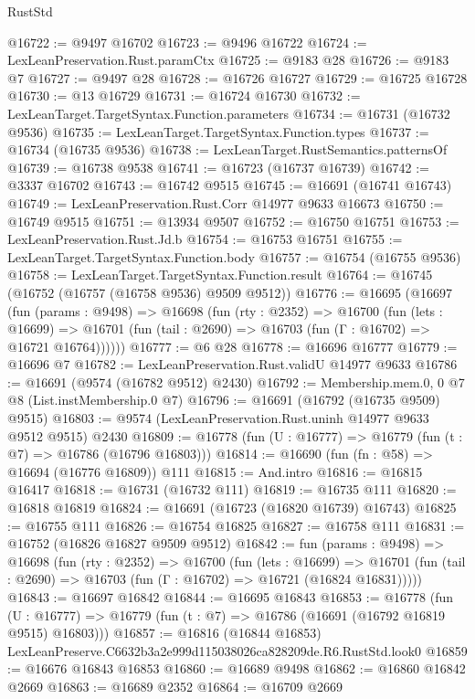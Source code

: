 \begin{lexlean}{RustStd}
\begin{coremodule}
@16722 := @9497 @16702
@16723 := @9496 @16722
@16724 := LexLeanPreservation.Rust.paramCtx
@16725 := @9183 @28
@16726 := @9183 @7
@16727 := @9497 @28
@16728 := @16726 @16727
@16729 := @16725 @16728
@16730 := @13 @16729
@16731 := @16724 @16730
@16732 := LexLeanTarget.TargetSyntax.Function.parameters
@16734 := @16731 (@16732 @9536)
@16735 := LexLeanTarget.TargetSyntax.Function.types
@16737 := @16734 (@16735 @9536)
@16738 := LexLeanTarget.RustSemantics.patternsOf
@16739 := @16738 @9538
@16741 := @16723 (@16737 @16739)
@16742 := @3337 @16702
@16743 := @16742 @9515
@16745 := @16691 (@16741 @16743)
@16749 := LexLeanPreservation.Rust.Corr @14977 @9633 @16673
@16750 := @16749 @9515
@16751 := @13934 @9507
@16752 := @16750 @16751
@16753 := LexLeanPreservation.Rust.Jd.b
@16754 := @16753 @16751
@16755 := LexLeanTarget.TargetSyntax.Function.body
@16757 := @16754 (@16755 @9536)
@16758 := LexLeanTarget.TargetSyntax.Function.result
@16764 := @16745 (@16752 (@16757 (@16758 @9536) @9509 @9512))
@16776 := @16695
    (@16697
      (fun (params : @9498) =>
      @16698
        (fun (rty : @2352) =>
        @16700
          (fun (lets : @16699) =>
          @16701 (fun (tail : @2690) => @16703 (fun (Γ : @16702) => @16721 @16764))))))
@16777 := @6 @28
@16778 := @16696 @16777
@16779 := @16696 @7
@16782 := LexLeanPreservation.Rust.validU @14977 @9633
@16786 := @16691 (@9574 (@16782 @9512) @2430)
@16792 := Membership.mem.{0, 0} @7 @8 (List.instMembership.{0} @7)
@16796 := @16691 (@16792 (@16735 @9509) @9515)
@16803 := @9574 (LexLeanPreservation.Rust.uninh @14977 @9633 @9512 @9515) @2430
@16809 := @16778 (fun (U : @16777) => @16779 (fun (t : @7) => @16786 (@16796 @16803)))
@16814 := @16690 (fun (fn : @58) => @16694 (@16776 @16809)) @111
@16815 := And.intro
@16816 := @16815 @16417
@16818 := @16731 (@16732 @111)
@16819 := @16735 @111
@16820 := @16818 @16819
@16824 := @16691 (@16723 (@16820 @16739) @16743)
@16825 := @16755 @111
@16826 := @16754 @16825
@16827 := @16758 @111
@16831 := @16752 (@16826 @16827 @9509 @9512)
@16842 := fun (params : @9498) =>
  @16698
    (fun (rty : @2352) =>
    @16700
      (fun (lets : @16699) =>
      @16701 (fun (tail : @2690) => @16703 (fun (Γ : @16702) => @16721 (@16824 @16831)))))
@16843 := @16697 @16842
@16844 := @16695 @16843
@16853 := @16778
    (fun (U : @16777) => @16779 (fun (t : @7) => @16786 (@16691 (@16792 @16819 @9515) @16803)))
@16857 := @16816 (@16844 @16853) LexLeanPreserve.C6632b3a2e999d115038026ca828209de.R6.RustStd.look0
@16859 := @16676 @16843 @16853
@16860 := @16689 @9498
@16862 := @16860 @16842 @2669
@16863 := @16689 @2352
@16864 := @16709 @2669

\end{coremodule}
\end{lexlean}
